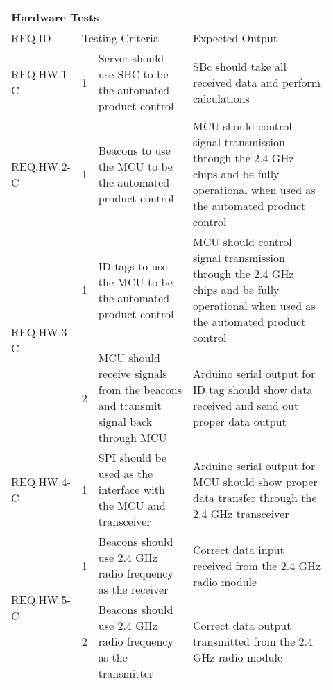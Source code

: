 \begin{table}[h!]
    \centering
    \begin{tabular}{|m{0.15\linewidth}|m{0.02\linewidth}|m{0.3\linewidth}|m{0.45\linewidth}|} 
    \hline
    \multicolumn{4}{|l|}{Hardware Tests}           \\ 
    \hline
    REQ.ID & \multicolumn{2}{l|}{Testing Criteria} & Expected Output         \\ 
    \hline
    REQ.HW.1-C                  
    & 1 
    & Server should use SBC to be the automated product control
    & SBc should take all received data and perform calculations   \\ 
    \hline
   
    REQ.HW.2-C                  
    & 1 
    & Beacons to use the MCU to be the automated product control
    & MCU should control signal transmission through the 2.4 GHz chips and be fully operational 
    when used as the automated product control         \\ 
    \hline
    
    \multirow{2}{*}{REQ.HW.3-C} 
    & 1 
    & ID tags to use the MCU to be the automated product control
    & MCU should control signal transmission through the 2.4 GHz chips and be fully operational 
    when used as the automated product control            \\ 
    \cline{2-4}
    & 2 
    & MCU should receive signals from the beacons and transmit signal back through MCU  
    & Arduino serial output for ID tag should show data received and send out proper data output        \\
    \hline
    
    REQ.HW.4-C                  
    & 1 
    & SPI should be used as the interface with the MCU and transceiver
    & Arduino serial output for MCU should show proper data transfer through the 2.4 GHz transceiver   \\ 
    \hline
    
    \multirow{2}{*}{REQ.HW.5-C} 
    & 1 
    & Beacons should use 2.4 GHz radio frequency as the receiver     
    & Correct data input received from the 2.4 GHz radio module          \\ 
    \cline{2-4}
    & 2 
    & Beacons should use 2.4 GHz radio frequency as the transmitter     
    & Correct data output transmitted from the 2.4 GHz radio module   \\
    \hline
    

\end{tabular}
\end{table}
